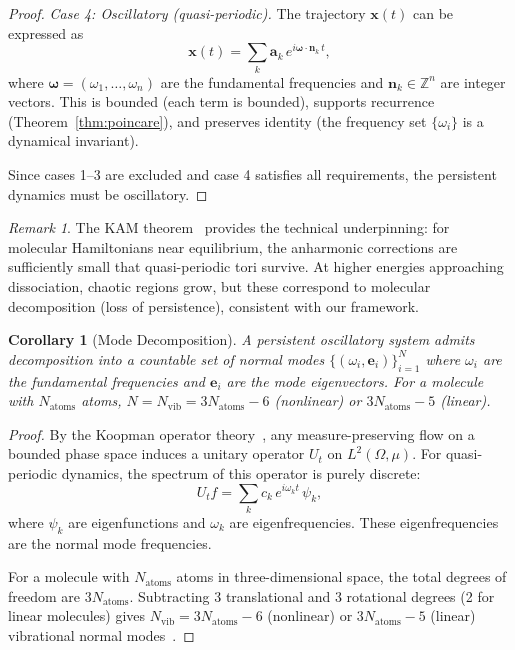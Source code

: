 \documentclass[11pt,twocolumn,a4paper]{article}
\newtheorem{corollary}[theorem]{Corollary}
\theoremstyle{definition}
\theoremstyle{remark}
\newtheorem{remark}[theorem]{Remark}
\newcommand{\Integer}{\mathbb{Z}}
\newcommand{\Nvib}{N_{\mathrm{vib}}}
\begin{document}
\begin{proof}
\emph{Case 4: Oscillatory (quasi-periodic).} The trajectory $\mathbf{x}(t)$ can be expressed as
\[
  \mathbf{x}(t) = \sum_{k} \mathbf{a}_k \, e^{i \boldsymbol{\omega} \cdot \mathbf{n}_k \, t},
\]
where $\boldsymbol{\omega} = (\omega_1, \ldots, \omega_n)$ are the fundamental frequencies and $\mathbf{n}_k \in \Integer^n$ are integer vectors. This is bounded (each term is bounded), supports recurrence (Theorem~\ref{thm:poincare}), and preserves identity (the frequency set $\{\omega_i\}$ is a dynamical invariant).

Since cases 1--3 are excluded and case 4 satisfies all requirements, the persistent dynamics must be oscillatory.
\end{proof}

\begin{remark}
The KAM theorem~\citep{kolmogorov1954} provides the technical underpinning: for molecular Hamiltonians near equilibrium, the anharmonic corrections are sufficiently small that quasi-periodic tori survive. At higher energies approaching dissociation, chaotic regions grow, but these correspond to molecular decomposition (loss of persistence), consistent with our framework.
\end{remark}

\begin{corollary}[Mode Decomposition]
\label{cor:mode-decomposition}
A persistent oscillatory system admits decomposition into a countable set of normal modes $\{(\omega_i, \mathbf{e}_i)\}_{i=1}^{N}$ where $\omega_i$ are the fundamental frequencies and $\mathbf{e}_i$ are the mode eigenvectors. For a molecule with $N_{\mathrm{atoms}}$ atoms, $N = \Nvib = 3N_{\mathrm{atoms}} - 6$ (nonlinear) or $3N_{\mathrm{atoms}} - 5$ (linear).
\end{corollary}

\begin{proof}
By the Koopman operator theory~\citep{koopman1931}, any measure-preserving flow on a bounded phase space induces a unitary operator $U_t$ on $L^2(\Omega, \mu)$. For quasi-periodic dynamics, the spectrum of this operator is purely discrete:
\[
  U_t f = \sum_k c_k \, e^{i\omega_k t} \, \psi_k,
\]
where $\psi_k$ are eigenfunctions and $\omega_k$ are eigenfrequencies. These eigenfrequencies are the normal mode frequencies.

For a molecule with $N_{\mathrm{atoms}}$ atoms in three-dimensional space, the total degrees of freedom are $3N_{\mathrm{atoms}}$. Subtracting 3 translational and 3 rotational degrees (2 for linear molecules) gives $\Nvib = 3N_{\mathrm{atoms}} - 6$ (nonlinear) or $3N_{\mathrm{atoms}} - 5$ (linear) vibrational normal modes~\citep{wilson1955}.
\end{proof}
\end{document}
